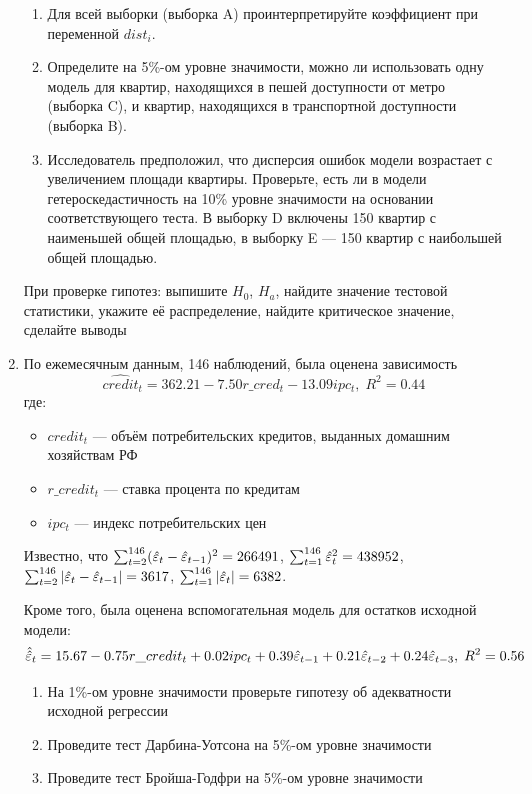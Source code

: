\documentclass[12pt, a4paper]{article}\usepackage[]{graphicx}\usepackage[]{color}
\begin{document}
\begin{enumerate}
\begin{enumerate}
\item Для всей выборки (выборка A) проинтерпретируйте коэффициент при переменной $dist_i$.
\item Определите на 5\%-ом уровне значимости, можно ли использовать одну модель для квартир, находящихся в пешей доступности от метро (выборка C), и квартир, находящихся в транспортной доступности (выборка B).
\item Исследователь предположил, что дисперсия ошибок модели возрастает с увеличением площади квартиры. Проверьте, есть ли в модели гетероскедастичность на 10\% уровне значимости на основании соответствующего теста. В выборку D включены 150 квартир с наименьшей общей площадью, в выборку E — 150 квартир с наибольшей общей площадью.
\end{enumerate}

При проверке гипотез: выпишите $H_0$, $H_a$, найдите значение тестовой статистики, укажите её распределение, найдите критическое значение, сделайте выводы


\item По ежемесячным данным, 146 наблюдений, была оценена зависимость
\[
\widehat{credit}_t = 362.21-7.50 r\_cred_t-13.09 ipc_t, \; R^2=0.44
\]
где:
\begin{itemize}
\item $credit_t$ — объём потребительских кредитов, выданных домашним хозяйствам РФ
\item $r\_credit_t$ — ставка процента по кредитам
\item $ipc_t$ — индекс потребительских цен
\end{itemize}

Известно, что $\sum_{t=2}^{146} (\hat{\varepsilon}_t - \hat{\varepsilon}_{t-1})^2 = 266491$, $\sum_{t=1}^{146} \hat{\varepsilon}_t^2 = 438952$, $\sum_{t=2}^{146} |\hat{\varepsilon}_t - \hat{\varepsilon}_{t-1}| = 3617$, $\sum_{t=1}^{146} |\hat{\varepsilon}_t| = 6382$.

Кроме того, была оценена вспомогательная модель для остатков исходной модели:
\[
\hat{\hat{\varepsilon}}_t=15.67-0.75 r\_credit_t+0.02 ipc_t+0.39 \hat{\varepsilon}_{t-1}+0.21 \hat{\varepsilon}_{t-2}+0.24 \hat{\varepsilon}_{t-3}, \; R^2=0.56
\]

\begin{enumerate}
\item На 1\%-ом уровне значимости проверьте гипотезу об адекватности исходной регрессии
\item Проведите тест Дарбина-Уотсона на 5\%-ом уровне значимости
\item Проведите тест Бройша-Годфри на 5\%-ом уровне значимости
\end{enumerate}


\end{enumerate}
\end{document}
